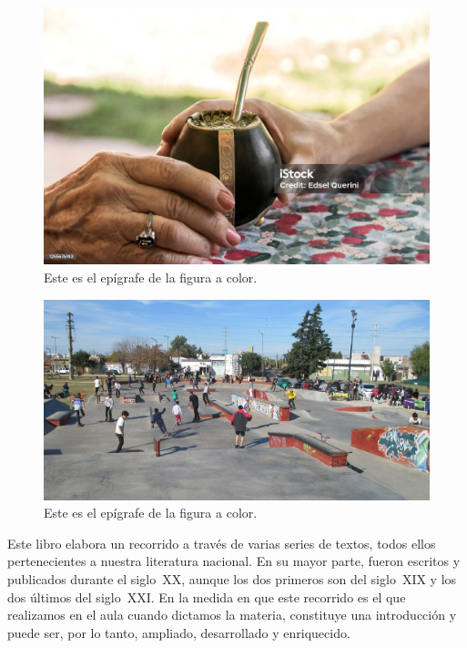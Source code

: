 			\else
			\ifEPUB
			\begin{figure}
			\centering
			\includegraphics[width=\linewidth]{./media/imagen1.jpg}
			\caption{Este es el epígrafe de la figura a color.}
			\end{figure}
				\else
				\ifODT
				\begin{figure}
				\centering
				\includegraphics[width=\linewidth]{./media/image14.jpeg}
				\caption{Este es el epígrafe de la figura a color.}
				\end{figure}
				\fi
			\fi
		\fi
	\fi
\fi

Este libro elabora un recorrido a través de varias series de textos, todos ellos pertenecientes a nuestra literatura nacional. En su mayor parte, fueron escritos y publicados durante el siglo~XX, aunque los dos primeros son del siglo~XIX y los dos últimos del siglo~XXI. En la medida en que este recorrido es el que realizamos en el aula cuando dictamos la materia, constituye una introducción y puede ser, por lo tanto, ampliado, desarrollado y enriquecido.

